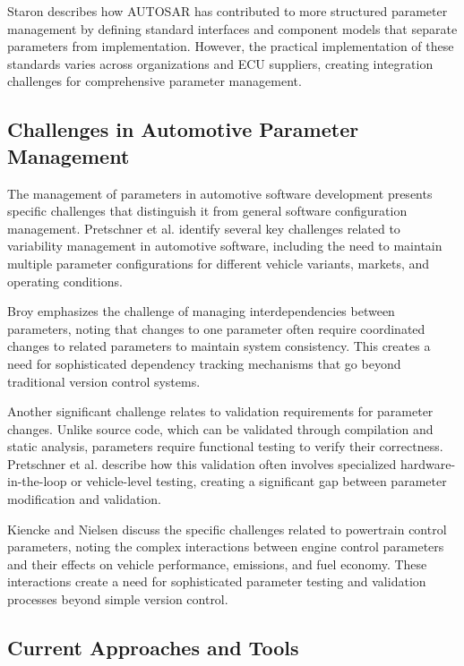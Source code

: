 Staron \cite{staron2021automotive} describes how \ac{AUTOSAR} has contributed to more structured parameter management by defining standard interfaces and component models that separate parameters from implementation. However, the practical implementation of these standards varies across organizations and \ac{ECU} suppliers, creating integration challenges for comprehensive parameter management.

\subsection{Challenges in Automotive Parameter Management}
\label{subsec:challenges-parameter-management}

The management of parameters in automotive software development presents specific challenges that distinguish it from general software configuration management. Pretschner et al. \cite{pretschner2007software} identify several key challenges related to variability management in automotive software, including the need to maintain multiple parameter configurations for different vehicle variants, markets, and operating conditions.

Broy \cite{broy2006challenges} emphasizes the challenge of managing interdependencies between parameters, noting that changes to one parameter often require coordinated changes to related parameters to maintain system consistency. This creates a need for sophisticated dependency tracking mechanisms that go beyond traditional version control systems.

Another significant challenge relates to validation requirements for parameter changes. Unlike source code, which can be validated through compilation and static analysis, parameters require functional testing to verify their correctness. Pretschner et al. \cite{pretschner2007software} describe how this validation often involves specialized hardware-in-the-loop or vehicle-level testing, creating a significant gap between parameter modification and validation.

Kiencke and Nielsen \cite{kiencke2000automotive} discuss the specific challenges related to powertrain control parameters, noting the complex interactions between engine control parameters and their effects on vehicle performance, emissions, and fuel economy. These interactions create a need for sophisticated parameter testing and validation processes beyond simple version control.

\subsection{Current Approaches and Tools}
\label{subsec:current-approaches-tools}

